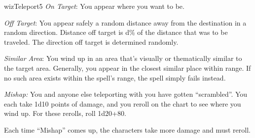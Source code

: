 \begin{spellcard}{wiz}{Teleport}{5}
  \emph{On Target}: You appear where you want to be.

  \emph{Off Target}: You appear safely a random distance away from the
  destination in a random direction. Distance off target is d\% of the
  distance that was to be traveled. The direction off target is determined
  randomly.

  \emph{Similar Area}: You wind up in an area that's visually or
  the\-ma\-tic\-ally similar to the target area. Generally, you appear in the
  closest similar place within range. If no such area exists within the
  spell's range, the spell simply fails instead.

  \emph{Mishap:} You and anyone else teleporting with you have gotten
  ``scrambled''. You each take 1d10 points of damage, and you reroll on the
  chart to see where you wind up. For these rerolls, roll 1d20+80.

  Each time ``Mishap'' comes up, the characters take more damage and must
  reroll.

\end{spellcard}
